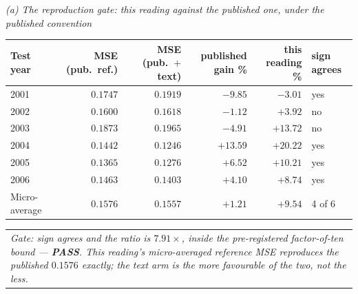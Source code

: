 \begin{table}[p]
\emph{(a) The reproduction gate: this reading against the published one, under the published convention}\\[0.4ex]
\begin{tabular}{@{}lrrrrl@{}}
\toprule
Test year & MSE (pub.\ ref.) & MSE (pub.\ $+$ text) & published gain \% & this reading \% & sign agrees \\
\midrule
2001 & $0.1747$ & $0.1919$ & $-9.85$ & $-3.01$ & yes \\
2002 & $0.1600$ & $0.1618$ & $-1.12$ & $+3.92$ & no \\
2003 & $0.1873$ & $0.1965$ & $-4.91$ & $+13.72$ & no \\
2004 & $0.1442$ & $0.1246$ & $+13.59$ & $+20.22$ & yes \\
2005 & $0.1365$ & $0.1276$ & $+6.52$ & $+10.21$ & yes \\
2006 & $0.1463$ & $0.1403$ & $+4.10$ & $+8.74$ & yes \\
\midrule
Micro-average & $0.1576$ & $0.1557$ & $\mathbf{+1.21}$ & $\mathbf{+9.54}$ & 4 of 6 \\
\bottomrule
\end{tabular}

\vspace{0.4ex}
\begin{tabular}{@{}p{}@{}}
\emph{Gate: sign agrees and the ratio is $7.91\times$, inside the pre-registered factor-of-ten bound --- \textbf{PASS}. This reading's micro-averaged reference MSE reproduces the published $0.1576$ exactly; the text arm is the more favourable of the two, not the less.} \\
\end{tabular}


\end{table}
